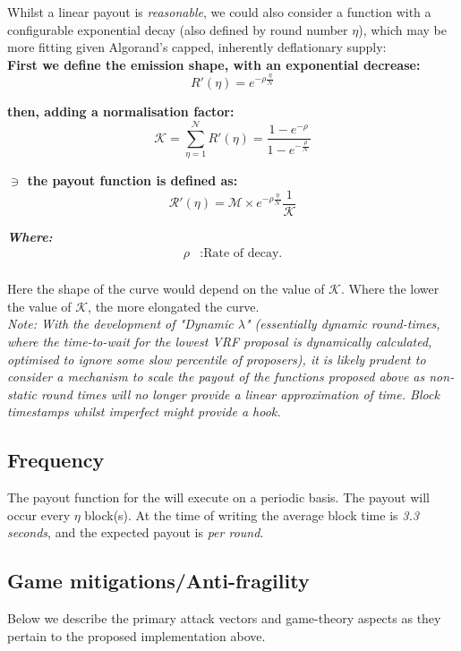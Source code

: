 \documentclass[11pt,a4paper]{article}
\begin{document}
Whilst a linear payout is \textit{reasonable}, we could also consider a function with a configurable exponential decay 
(also defined by round number $\eta$), which may be more fitting given Algorand's capped, inherently deflationary 
supply: \\ 

\textbf{First we define the emission shape, with an exponential decrease:}
\[
R'(\eta)= e^{-\rho\frac{\eta}{\mathcal{N}}}
\]

\textbf{then, adding a normalisation factor:}
\[
\mathcal{K} = \sum_{\eta=1}^\mathcal{N}R'(\eta)= \frac{1-e^{-\rho}}{1-e^{-\frac{\rho}{\mathcal{N}}}}
\]

\textbf{$\ni$ the payout function is defined as:}
\[
\mathcal{R'}(\eta)= \mathcal{M}\times e^{-\rho\frac{\eta}{\mathcal{N}}} \frac{1}{\mathcal{K}}
\]

\textbf{\emph{Where:}}
\begin{align*}
\rho & : \text{Rate of decay.} \\
\end{align*}

Here the shape of the curve would depend on the value of \(\mathcal{K}\). Where the lower the value of \(\mathcal{K}\), 
the more elongated the curve. \\

\emph{Note: With the development of "Dynamic $\lambda$" (essentially dynamic round-times, where the time-to-wait for the
lowest VRF proposal is dynamically calculated, optimised to ignore some slow percentile of proposers), it is likely
prudent to consider a mechanism to scale the payout of the functions proposed above as non-static round times will no 
longer provide a linear approximation of time. Block timestamps whilst imperfect might provide a hook.}

\subsection{Frequency}
The payout function for the  will execute on a periodic basis. The payout will occur every 
$\eta$ block(s). At the time of writing the average block time is \emph{3.3 seconds}, and the expected payout is 
\textit{per round}. 

\pagebreak

\subsection{Game mitigations/Anti-fragility}
Below we describe the primary attack vectors and game-theory aspects as they pertain to the proposed implementation 
above.
\end{document}
